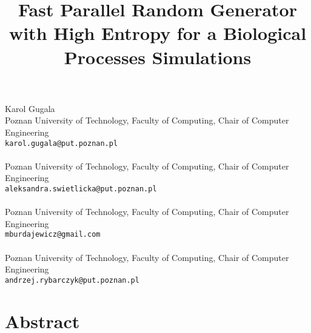 \title{Fast Parallel Random Generator with High Entropy for a Biological Processes Simulations}
\author{}  \institute{}
\maketitle
\begin{center}
{\large Karol Gugala}\\
Poznan University of Technology, Faculty of Computing, Chair of Computer Engineering\\
{\tt karol.gugala@put.poznan.pl}
\\ \vspace{4mm}{\large Aleksandra Swietlicka}\\
Poznan University of Technology, Faculty of Computing, Chair of Computer Engineering\\
{\tt aleksandra.swietlicka@put.poznan.pl}
\\ \vspace{4mm}{\large Michal Burdajewicz}\\
Poznan University of Technology, Faculty of Computing, Chair of Computer Engineering\\
{\tt mburdajewicz@gmail.com}
\\ \vspace{4mm}{\large Andrzej  Rybarczyk}\\
Poznan University of Technology, Faculty of Computing, Chair of Computer Engineering\\
{\tt andrzej.rybarczyk@put.poznan.pl}

\end{center}

\section*{Abstract}

